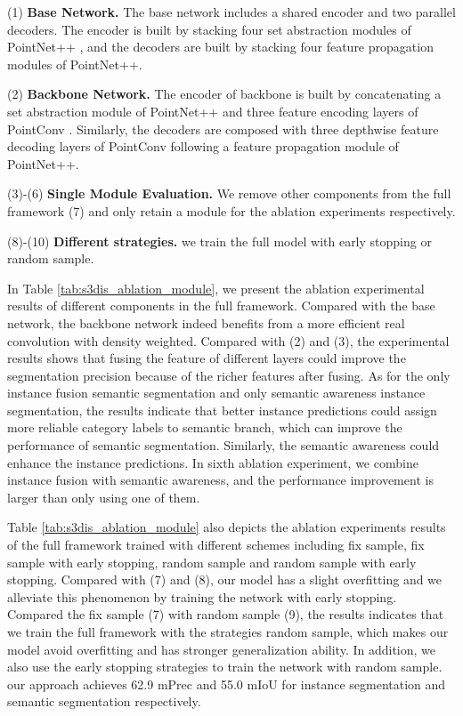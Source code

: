 \documentclass[letterpaper]{article} \usepackage{aaai20}  \usepackage{times}  \usepackage{helvet} \usepackage{courier}  \usepackage[hyphens]{url}  \usepackage{graphicx} \urlstyle{rm} \def\UrlFont{\rm}  \usepackage{graphicx}  \frenchspacing  \setlength{\pdfpagewidth}{8.5in}  \setlength{\pdfpageheight}{11in}
\begin{document}
\noindent(1) \textbf{Base Network.} The base network includes a shared encoder and two parallel decoders. The encoder is built by stacking four set abstraction modules of PointNet++ \cite{qi2017pointnet++}, and the decoders are built by stacking four feature propagation modules of PointNet++.

\noindent(2) \textbf{Backbone Network.} The encoder of backbone is built by concatenating a set abstraction module of PointNet++ and three feature encoding layers of PointConv \cite{wu2018pointconv}. Similarly, the decoders are composed with three depthwise feature decoding layers of PointConv following a feature propagation module of PointNet++.

\noindent(3)-(6) \textbf{Single Module Evaluation.} We remove other components from the full framework (7) and only retain a module for the ablation experiments respectively.

\noindent(8)-(10) \textbf{Different strategies.} we train the full model with early stopping or random sample.

In Table \ref{tab:s3dis_ablation_module}, we present the ablation experimental results of different components in the full framework. Compared with the base network, the backbone network indeed benefits from a more efficient real convolution with density weighted. Compared with (2) and (3), the experimental results shows that fusing the feature of different layers could improve the segmentation precision because of the richer features after fusing. As for the only instance fusion semantic segmentation and only semantic awareness instance segmentation, the results indicate that better instance predictions could assign more reliable category labels to semantic branch, which can improve the performance of semantic segmentation. Similarly, the semantic awareness could enhance the instance predictions. In sixth ablation experiment, we combine instance fusion with semantic awareness, and the performance improvement is larger than only using one of them.

Table \ref{tab:s3dis_ablation_module} also depicts the ablation experiments results of the full framework trained with different schemes including fix sample, fix sample with early stopping, random sample and random sample with early stopping. Compared with (7) and (8), our model has a slight overfitting and we alleviate this phenomenon by training the network with early stopping. Compared the fix sample (7) with random sample (9), the results indicates that we train the full framework with the strategies random sample, which makes our model avoid overfitting and has stronger generalization ability. In addition, we also use the early stopping strategies to train the network with random sample. our approach achieves 62.9 mPrec and 55.0 mIoU for instance segmentation and semantic segmentation respectively.
\end{document}
